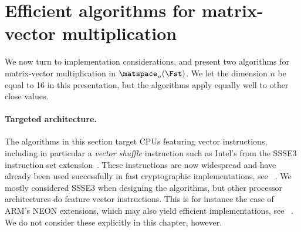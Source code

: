 \section{Efficient algorithms for matrix-vector multiplication}
\label{implem}

We now turn to implementation considerations, and present two algorithms
for matrix-vector multiplication in $\matspace_n(\Fst)$. We let the dimension
$n$ be equal to 16 in this presentation, but the algorithms apply equally well
to other close values.



\paragraph{Targeted architecture.}
The algorithms in this section target CPUs featuring vector instructions, including in particular a
\emph{vector shuffle} instruction such as Intel's \pshufb{} from the SSSE3 instruction set extension~\cite{ia64}. These instructions are
now widespread and have already been used successfully in fast cryptographic implementations, see \eg{}~\cite{vpaes,twine,sac2013}.
We mostly considered SSSE3 when designing the algorithms, but other processor architectures
do feature vector instructions. This is for instance the case of ARM's NEON extensions, which may also
yield efficient implementations, see \eg{}~\cite{Bernstein}. We do not consider these explicitly in this chapter, however.

